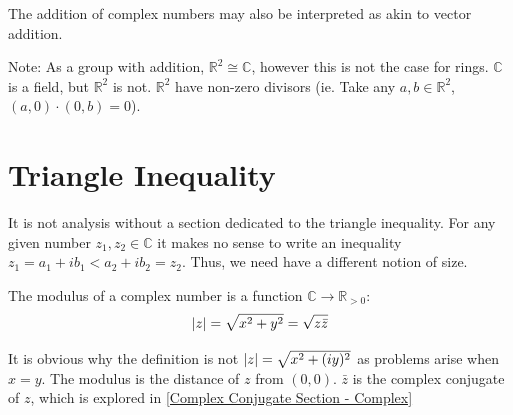 \documentclass[12pt, english]{book}
\begin{document}
	The addition of complex numbers may also be interpreted as akin to vector addition. 
	\begin{center}
	\end{center}
	Note: As a group with addition, \(\mathbb{R}^2 \cong \mathbb{C}\), however this is not the case for rings. \(\mathbb{C}\) is a field, but \(\mathbb{R}^2\) is not. \(\mathbb{R}^2\) have non-zero divisors (ie. Take any \(a,b \in \mathbb{R}^2\), \((a, 0) \cdot (0, b) = 0\)).
	
	\section{Triangle Inequality} \label{Triangle Inequality Section - Complex}
	It is not analysis without a section dedicated to the triangle inequality. For any given number $z_1, z_2 \in \mathbb{C}$ it makes no sense to write an inequality $z_1 = a_1 + ib_1 <  a_2 + ib_2 = z_2$. Thus, we need have a different notion of size. 
	
	\begin{definition}
		The modulus of a complex number is a function $\mathbb{C} \rightarrow \mathbb{R}_{>0}$:
		$$\abs{z} = \sqrt{x^2 + y^2} = \sqrt{z \bar{z}}$$
	\end{definition}
	It is obvious why the definition is not $\abs{z} = \sqrt{x^2 + (iy)^2}$ as problems arise when $x = y$. The modulus is the distance of $z$ from $(0, 0)$. $\bar{z}$ is the complex conjugate of $z$, which is explored in \cref{Complex Conjugate Section - Complex}
	
\end{document}

